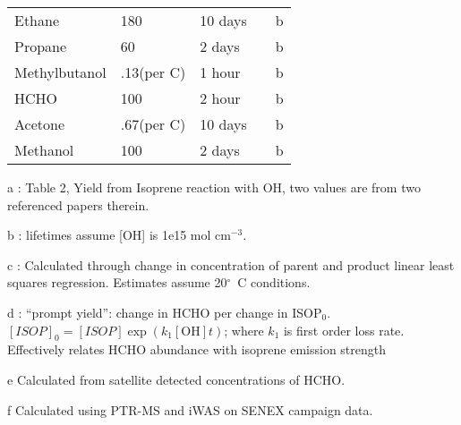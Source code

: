 \begin{table}
\begin{threeparttable}
\begin{tabular}{  l  l  l  l  l  }
	Ethane            & 180             & 10 days &             & b     \\ 
	Propane           & 60              & 2 days  &             & b     \\ 
	Methylbutanol     & .13(per C)      & 1 hour  &             & b     \\ 
	HCHO              & 100             & 2 hour  &             & b     \\ 
	Acetone           & .67(per C)      & 10 days &             & b     \\ 
	Methanol          & 100             & 2 days  &             & b     \\ %
	\bottomrule
    \end{tabular}
    \begin{tablenotes} %
      \item a \citet{AtkinsonArey2003}: Table 2, Yield from Isoprene reaction with OH, two values are from two referenced papers therein.
      \item b \citet{Palmer2003}: lifetimes assume [OH] is 1e15 mol cm$^{-3}$.
      \item c \citep{Lee2006}: Calculated through change in concentration of parent and product linear least squares regression.
	Estimates assume 20$^\circ$~C conditions.
	  \item d \citet{Wolfe2016}: ``prompt yield'': change in HCHO per change in ISOP$_0$.
	    $[ISOP]_0=[ISOP]\exp(k_1[\mathrm{OH}]t)$; where $k_1$ is first order loss rate.
	    Effectively relates HCHO abundance with isoprene emission strength
      \item e Calculated from satellite detected concentrations of HCHO.
      \item f Calculated using PTR-MS and iWAS on SENEX campaign data.
    \end{tablenotes}
    \label{ch_isop:tab:VOCLiteratureYields}
  \end{threeparttable} \end{table}

